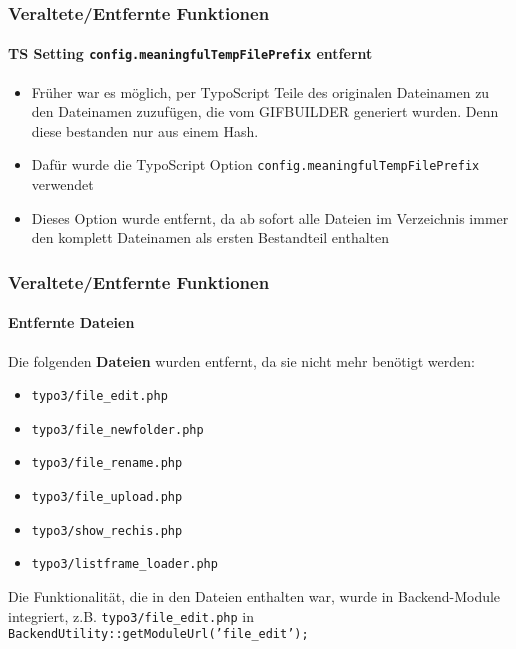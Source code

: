 \begin{frame}[fragile]
	\frametitle{Veraltete/Entfernte Funktionen}
	\framesubtitle{TS Setting \texttt{config.meaningfulTempFilePrefix} entfernt}

	\begin{itemize}
		\item Früher war es möglich, per TypoScript Teile des originalen Dateinamen zu den Dateinamen zuzufügen, die vom GIFBUILDER generiert wurden. Denn diese bestanden nur aus einem Hash.
		\item Dafür wurde die TypoScript Option \texttt{config.meaningfulTempFilePrefix} verwendet
		\item Dieses Option wurde entfernt, da ab sofort alle Dateien im Verzeichnis  immer den komplett Dateinamen als ersten Bestandteil enthalten
	\end{itemize}

\end{frame}




\begin{frame}[fragile]
	\frametitle{Veraltete/Entfernte Funktionen}
	\framesubtitle{Entfernte Dateien}

	Die folgenden \textbf{Dateien} wurden entfernt, da sie nicht mehr benötigt werden:

	\begin{itemize}
		\item \texttt{typo3/file\_edit.php}
		\item \texttt{typo3/file\_newfolder.php}
		\item \texttt{typo3/file\_rename.php}
		\item \texttt{typo3/file\_upload.php}
		\item \texttt{typo3/show\_rechis.php}
		\item \texttt{typo3/listframe\_loader.php}
	\end{itemize}

	Die Funktionalität, die in den Dateien enthalten war, wurde in Backend-Module integriert, z.B. \texttt{typo3/file\_edit.php} in \texttt{BackendUtility::getModuleUrl('file\_edit');}
\end{frame}

